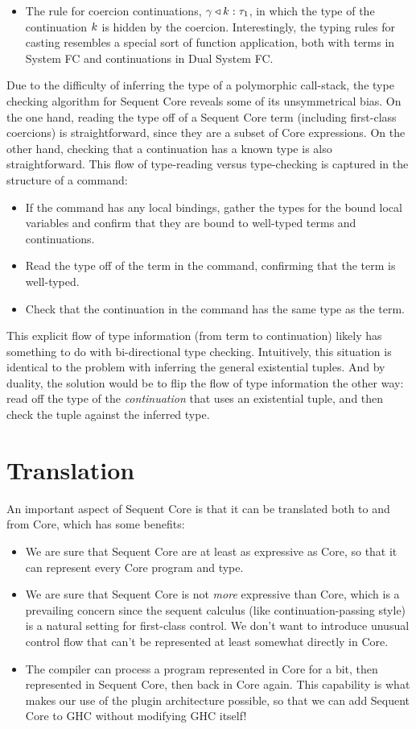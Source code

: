 \documentclass{article}
\begin{document}
\begin{itemize}
\item The rule for coercion continuations, ${\gamma}\triangleleft{k} : \tau_1$, in which
  the type of the continuation $k$ is hidden by the coercion.  Interestingly,
  the typing rules for casting resembles a special sort of function application,
  both with terms in System FC and continuations in Dual System FC.
\end{itemize}

Due to the difficulty of inferring the type of a polymorphic call-stack, the
type checking algorithm for Sequent Core reveals some of its unsymmetrical bias.
On the one hand, reading the type off of a Sequent Core term (including
first-class coercions) is straightforward, since they are a subset of Core
expressions.  On the other hand, checking that a continuation has a known type
is also straightforward.  This flow of type-reading versus type-checking is
captured in the structure of a command:
\begin{itemize}
\item If the command has any local bindings, gather the types for the bound
  local variables and confirm that they are bound to well-typed terms and
  continuations.
\item Read the type off of the term in the command, confirming that the term is
  well-typed.
\item Check that the continuation in the command has the same type as the term.
\end{itemize}
This explicit flow of type information (from term to continuation) likely has
something to do with bi-directional type checking.  Intuitively, this situation
is identical to the problem with inferring the general existential tuples.  And
by duality, the solution would be to flip the flow of type information the other
way: read off the type of the \emph{continuation} that uses an existential
tuple, and then check the tuple against the inferred type.

\section{Translation}
\label{sec:translation}

An important aspect of Sequent Core is that it can be translated both to and
from Core, which has some benefits:
\begin{itemize}
\item We are sure that Sequent Core are at least as expressive as Core, so that
  it can represent every Core program and type.
\item We are sure that Sequent Core is not \emph{more} expressive than Core,
  which is a prevailing concern since the sequent calculus (like
  continuation-passing style) is a natural setting for first-class control.  We
  don't want to introduce unusual control flow that can't be represented at
  least somewhat directly in Core.
\item The compiler can process a program represented in Core for a bit, then
  represented in Sequent Core, then back in Core again.  This capability is what
  makes our use of the plugin architecture possible, so that we can add Sequent
  Core to GHC without modifying GHC itself!
\end{itemize}
\end{document}
